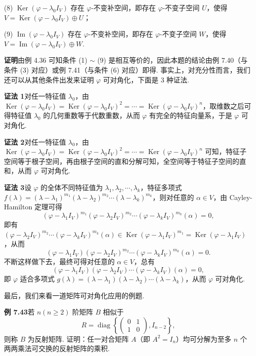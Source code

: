 \documentclass[UTF8,12pt,a4paper,fontset=fandol]{ctexart}
\begin{document}
(8) $\operatorname{Ker}(\varphi-\lambda_0I_V)$ 存在 $\varphi$-不变补空间，即存在 $\varphi$-不变子空间 $U$，使得 $V=\operatorname{Ker}(\varphi-\lambda_0I_V)\oplus U$；

(9) $\operatorname{Im}(\varphi-\lambda_0I_V)$ 存在 $\varphi$-不变补空间，即存在 $\varphi$-不变子空间 $W$，使得 $V=\operatorname{Im}(\varphi-\lambda_0I_V)\oplus W$.

\noindent\textbf{证明}\quad 由例 4.36 可知条件 (1) $\sim$ (9) 是相互等价的，因此本题的结论由例 7.40（与条件 (3) 对应）或例 7.41（与条件 (6) 对应）即得. 事实上，对充分性而言，我们还可以从其他条件出发来证明 $\varphi$ 可对角化，下面是 3 种证法.

\noindent\textbf{证法 1}\quad 对任一特征值 $\lambda_0$，由 $\operatorname{Ker}(\varphi-\lambda_0I_V)=\operatorname{Ker}(\varphi-\lambda_0I_V)^2=\cdots=\operatorname{Ker}(\varphi-\lambda_0I_V)^n$，取维数之后可得特征值 $\lambda_0$ 的几何重数等于代数重数，从而 $\varphi$ 有完全的特征向量系，于是 $\varphi$ 可对角化.

\noindent\textbf{证法 2}\quad 对任一特征值 $\lambda_0$，由 $\operatorname{Ker}(\varphi-\lambda_0I_V)=\operatorname{Ker}(\varphi-\lambda_0I_V)^2=\cdots=\operatorname{Ker}(\varphi-\lambda_0I_V)^n$ 可知，特征子空间等于根子空间，再由根子空间的直和分解可知，全空间等于特征子空间的直和，从而 $\varphi$ 可对角化.

\noindent\textbf{证法 3}\quad 设 $\varphi$ 的全体不同特征值为 $\lambda_1,\lambda_2,\cdots,\lambda_k$，特征多项式 $f(\lambda)=(\lambda-\lambda_1)^{m_1}(\lambda-\lambda_2)^{m_2}\cdots(\lambda-\lambda_k)^{m_k}$，则对任意的 $\alpha\in V$，由 Cayley-Hamilton 定理可得
\[
(\varphi-\lambda_1I_V)^{m_1}(\varphi-\lambda_2I_V)^{m_2}\cdots(\varphi-\lambda_kI_V)^{m_k}(\alpha)=0,
\]
即有 $(\varphi-\lambda_2I_V)^{m_2}\cdots(\varphi-\lambda_kI_V)^{m_k}(\alpha)\in\operatorname{Ker}(\varphi-\lambda_1I_V)^{m_1}=\operatorname{Ker}(\varphi-\lambda_1I_V)$，从而
\[
(\varphi-\lambda_1I_V)(\varphi-\lambda_2I_V)^{m_2}\cdots(\varphi-\lambda_kI_V)^{m_k}(\alpha)=0.
\]
不断这样做下去，最终可得对任意的 $\alpha\in V$，总有
\[
(\varphi-\lambda_1I_V)(\varphi-\lambda_2I_V)\cdots(\varphi-\lambda_kI_V)(\alpha)=0,
\]
即 $\varphi$ 适合多项式 $g(\lambda)=(\lambda-\lambda_1)(\lambda-\lambda_2)\cdots(\lambda-\lambda_k)$，从而 $\varphi$ 可对角化.

最后，我们来看一道矩阵可对角化应用的例题.

\noindent\textbf{例 7.43}\quad 若 $n(n\ge 2)$ 阶矩阵 $B$ 相似于
\[
R=\operatorname{diag}\left\{
\left(\begin{array}{cc}
0 & 1\\
1 & 0
\end{array}\right),I_{n-2}\right\},
\]
则称 $B$ 为反射矩阵. 证明：任一对合矩阵 $A$（即 $A^2=I_n$）均可分解为至多 $n$ 个两两乘法可交换的反射矩阵的乘积.
\end{document}
